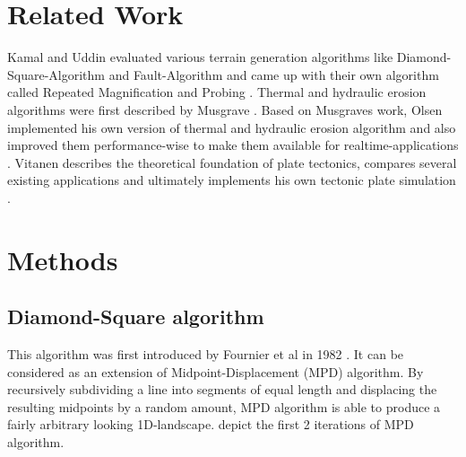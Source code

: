 \documentclass[11pt,a4paper,twoside,openright]{report}
\begin{document}
\chapter{Related Work}
\label{sec:related}
Kamal and Uddin evaluated various terrain generation algorithms like Diamond-Square-Algorithm and Fault-Algorithm and came up with their own algorithm called Repeated Magnification and Probing \cite{Kamal:2007:PCT:1321261.1321264}. Thermal and hydraulic erosion algorithms were first described by Musgrave \cite{Musgrave:1989:SRE:74333.74337}. Based on Musgraves work, Olsen implemented his own version of thermal and hydraulic erosion algorithm and also improved them performance-wise to make them available for realtime-applications \cite{Olsen:2004}. Vitanen describes the theoretical foundation of plate tectonics, compares several existing applications and ultimately implements his own tectonic plate simulation \cite{Vitanen:2012}.
\chapter{Methods}
\label{sec:methods}

\section{Diamond-Square algorithm}
This algorithm was first introduced by Fournier et al in 1982 \cite{Fournier:1982:CRS:358523.358553}. It can be considered as an extension of Midpoint-Displacement (MPD) algorithm. By recursively subdividing a line into segments of equal length and displacing the resulting midpoints by a random amount, MPD algorithm is able to produce a fairly arbitrary looking 1D-landscape.  depict the first 2 iterations of MPD algorithm.
\end{document}
